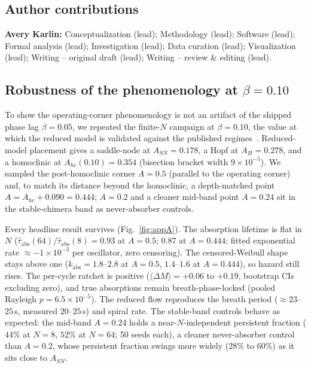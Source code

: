 \documentclass[pdflatex,sn-mathphys,Numbered]{sn-jnl}
\begin{document}
\subsection*{Author contributions}
\textbf{Avery Karlin:} Conceptualization (lead); Methodology (lead); Software
(lead); Formal analysis (lead); Investigation (lead); Data curation (lead);
Visualization (lead); Writing -- original draft (lead); Writing -- review \&
editing (lead).

\begin{appendices}

\section{Robustness of the phenomenology at $\beta = 0.10$}\label{app:beta}

To show the operating-corner phenomenology is not an artifact of the shipped phase
lag $\beta = 0.05$, we repeated the finite-$N$ campaign at $\beta = 0.10$, the value
at which the reduced model is validated against the published
regimes~\cite{abrams2008}. Reduced-model placement gives a saddle-node at
$A_{SN} = 0.178$, a Hopf at $A_H = 0.278$, and a homoclinic at
$A_{hc}(0.10) = 0.354$ (bisection bracket width $9\times10^{-5}$). We sampled the
post-homoclinic corner $A = 0.5$ (parallel to the operating corner) and, to match its
distance beyond the homoclinic, a depth-matched point
$A = A_{hc} + 0.090 = 0.444$; $A = 0.2$ and a cleaner mid-band point $A = 0.24$ sit
in the stable-chimera band as never-absorber controls.

Every headline result survives (Fig.~\ref{fig:appA}). The absorption lifetime is flat
in $N$ ($\hat\tau_{\mathrm{abs}}(64)/\hat\tau_{\mathrm{abs}}(8) = 0.93$ at $A = 0.5$;
$0.87$ at $A = 0.444$; fitted exponential rate $\approx -1\times10^{-3}$ per
oscillator, zero censoring). The censored-Weibull shape stays above one
($k_{\mathrm{abs}} = 1.8$--$2.8$ at $A = 0.5$, $1.4$--$1.6$ at $A = 0.444$), so hazard
still rises. The per-cycle ratchet is positive
($\langle\Delta M\rangle = +0.06$ to $+0.19$, bootstrap CIs excluding zero), and true
absorptions remain breath-phase-locked (pooled Rayleigh $p = 6.5\times10^{-5}$). The
reduced flow reproduces the breath period ($\approx 23$--$25$\,s, measured
$20$--$25$\,s) and spiral rate. The stable-band controls behave as expected: the
mid-band $A = 0.24$ holds a near-$N$-independent persistent fraction ($44\%$ at
$N = 8$, $52\%$ at $N = 64$; 50 seeds each), a cleaner never-absorber control than
$A = 0.2$, whose persistent fraction swings more widely ($28\%$ to $60\%$) as it sits
close to $A_{SN}$.


\end{appendices}
\end{document}
